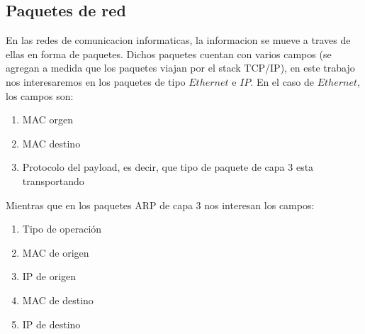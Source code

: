 \subsection{Paquetes de red}

En las redes de comunicacion informaticas, la informacion se mueve a traves de ellas en forma de paquetes. Dichos paquetes cuentan con varios campos (se agregan a medida que los paquetes viajan por el stack TCP/IP), en este trabajo nos interesaremos en los paquetes de tipo $Ethernet$ e $IP$. En el caso de $Ethernet$, los campos son:

\begin{enumerate}
	\item MAC orgen
	\item MAC destino
	\item Protocolo del payload, es decir, que tipo de paquete de capa 3 esta transportando
\end{enumerate}

Mientras que en los paquetes ARP de capa 3 nos interesan los campos:

\begin{enumerate}
	\item Tipo de operación
	\item MAC de origen
	\item IP de origen
	\item MAC de destino
	\item IP de destino
\end{enumerate}
